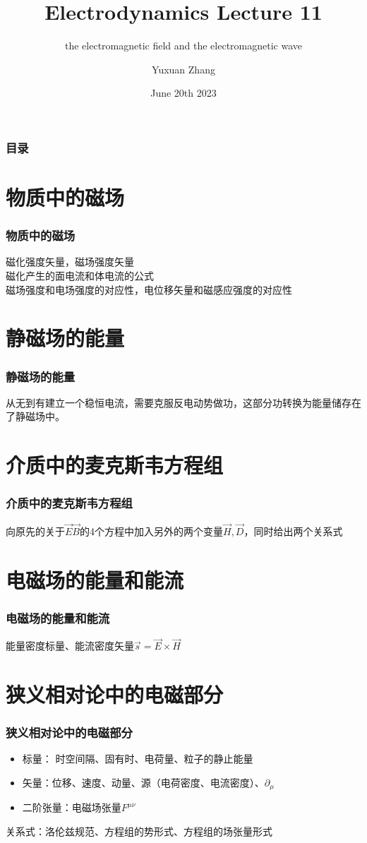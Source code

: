 \documentclass[10pt]{beamer}
\title[About Beamer] %
{Electrodynamics Lecture 11}
\subtitle{ the electromagnetic field and the electromagnetic wave }
\author %
{Yuxuan Zhang }
\institute[VFU] %
{
  School of Physics \quad
  Zhejiang University
}
\date[VLC 2021] %
{June 20th 2023}
\begin{document}
\frame{\titlepage}

\begin{frame}
    \frametitle{目录}
    \tableofcontents
\end{frame}

\section{物质中的磁场}
\begin{frame}
    \frametitle{物质中的磁场}
    磁化强度矢量，磁场强度矢量\\
    磁化产生的面电流和体电流的公式\\
    磁场强度和电场强度的对应性，电位移矢量和磁感应强度的对应性
\end{frame}

\section{静磁场的能量}
\begin{frame}
    \frametitle{静磁场的能量}
    从无到有建立一个稳恒电流，需要克服反电动势做功，这部分功转换为能量储存在了静磁场中。
\end{frame}

\section{介质中的麦克斯韦方程组}
\begin{frame}
    \frametitle{介质中的麦克斯韦方程组}
    向原先的关于$\vec{E}\vec{B}$的4个方程中加入另外的两个变量$\vec{H},\vec{D}$，同时给出两个关系式
\end{frame}


\section{电磁场的能量和能流}
\begin{frame}
    \frametitle{电磁场的能量和能流}
    能量密度标量、能流密度矢量$\vec{s} = \vec{E}\times \vec{H}$
\end{frame}


\section{狭义相对论中的电磁部分}
\begin{frame}
    \frametitle{狭义相对论中的电磁部分}
    \begin{itemize}
    \item     标量： 时空间隔、固有时、电荷量、粒子的静止能量
    \item 矢量：位移、速度、动量、源（电荷密度、电流密度）、$\partial_\mu$
    \item 二阶张量：电磁场张量$F^{\mu\nu}$
    \end{itemize}
    关系式：洛伦兹规范、方程组的势形式、方程组的场张量形式
\end{frame}
\end{document}
